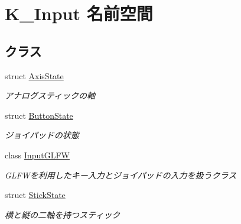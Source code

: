 \hypertarget{namespace_k___input}{}\section{K\+\_\+\+Input 名前空間}
\label{namespace_k___input}
\subsection*{クラス}
\begin{DoxyCompactItemize}
\item 
struct \mbox{\hyperlink{struct_k___input_1_1_axis_state}{Axis\+State}}
\begin{DoxyCompactList}\small\item\em アナログスティックの軸 \end{DoxyCompactList}\item 
struct \mbox{\hyperlink{struct_k___input_1_1_button_state}{Button\+State}}
\begin{DoxyCompactList}\small\item\em ジョイパッドの状態 \end{DoxyCompactList}\item 
class \mbox{\hyperlink{class_k___input_1_1_input_g_l_f_w}{Input\+G\+L\+FW}}
\begin{DoxyCompactList}\small\item\em G\+L\+F\+Wを利用したキー入力とジョイパッドの入力を扱うクラス \end{DoxyCompactList}\item 
struct \mbox{\hyperlink{struct_k___input_1_1_stick_state}{Stick\+State}}
\begin{DoxyCompactList}\small\item\em 横と縦の二軸を持つスティック \end{DoxyCompactList}\end{DoxyCompactItemize}
